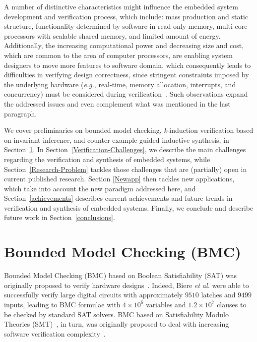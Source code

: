 \documentclass{acm_sen_article}
\begin{document}
A number of distinctive characteristics might influence the embedded system development and verification process, which include: mass production and static structure, functionality determined by software in read-only memory, multi-core processors with scalable shared memory, and limited amount of energy. Additionally, the increasing computational power and decreasing size and cost, which are common to the area of computer processors, are enabling system designers to move more features to software domain, which consequently leads to difficulties in verifying design correctness, since stringent constraints imposed by the underlying hardware ({\it e.g.}, real-time, memory allocation, interrupts, and concurrency) must be considered during verification~\cite{Kroening15}. Such observations expand the addressed issues and even complement what was mentioned in the last paragraph.

We cover preliminaries on bounded model checking, \textit{k}-induction verification based on invariant inference, and counter-example guided inductive synthesis, in Section~\ref{Preliminaries}. In Section~\ref{Verification-Challenges}, we describe the main challenges regarding the verification and synthesis of embedded systems, while Section~\ref{Research-Problem} tackles those challenges that are (partially) open in current published research. Section \ref{Newapp} then tackles new applications, which take into account the new paradigm addressed here, and Section~\ref{achievements} describes current achievements and future trends in verification and synthesis of embedded systems. Finally, we conclude and describe future work in Section~\ref{conclusions}.

\section{Bounded Model Checking (BMC)}
\label{Preliminaries}

Bounded Model Checking (BMC) based on Boolean Satisfiability (SAT) was originally proposed to verify hardware designs~\cite{Biere99,handbook09}. Indeed, Biere {\it et al.} were able to successfully verify large digital circuits with approximately $9510$ latches and $9499$ inputs, leading to BMC formulae with $4 \times 10^6$ variables and $1.2 \times 10^7$ clauses to be checked by standard SAT solvers. BMC based on Satisfiability Modulo Theories (SMT)~\cite{BarrettSST09}, in turn, was originally proposed to deal with increasing software verification complexity~\cite{Armando06}. 
\end{document}

